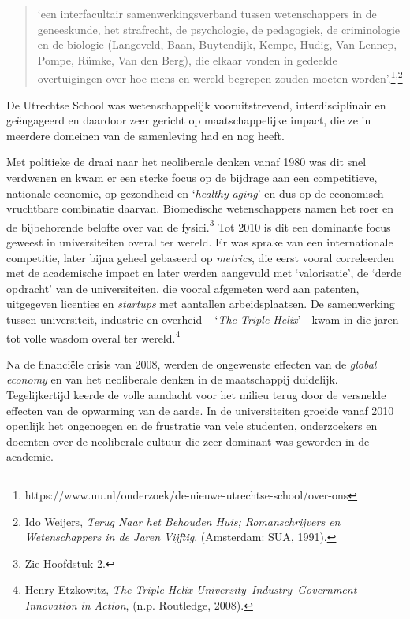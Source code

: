 \documentclass[smallauthor, chapterhaspagenum, nochapterinheader, pagenuminheader,  bigchapnum,medium2, tocpages,  garamond, titleinheader]{jote-book}
\begin{document}
	\begin{quote}
		\itshape

		‘een interfacultair samenwerkingsverband tussen wetenschappers in de geneeskunde, het strafrecht, de psychologie, de pedagogiek, de criminologie en de biologie (Langeveld, Baan, Buytendijk, Kempe, Hudig, Van Lennep, Pompe, Rümke, Van den Berg), die elkaar vonden in gedeelde overtuigingen over hoe mens en wereld begrepen zouden moeten worden'.\footnote{https://www.uu.nl/onderzoek/de-nieuwe-utrechtse-school/over-ons}\textsuperscript{,}\footnote{Ido Weijers, \emph{Terug Naar het Behouden Huis; Romanschrijvers en Wetenschappers in de Jaren Vijftig}. (Amsterdam: SUA, 1991). }
	\end{quote}

	 De Utrechtse School was wetenschappelijk vooruitstrevend, interdisciplinair en geëngageerd en daardoor zeer gericht op maatschappelijke impact, die ze in meerdere domeinen van de samenleving had en nog heeft.



	Met politieke de draai naar het neoliberale denken vanaf 1980 was dit snel verdwenen en kwam er een sterke focus op de bijdrage aan een competitieve, nationale economie, op gezondheid en ‘\emph{healthy}\emph{ }\emph{aging}' en dus op de economisch vruchtbare combinatie daarvan. Biomedische wetenschappers namen het roer en de bijbehorende belofte over van de fysici.\footnote{Zie Hoofdstuk 2.} Tot 2010 is dit een dominante focus geweest in universiteiten overal ter wereld. Er was sprake van een internationale competitie, later bijna geheel gebaseerd op \emph{metrics}, die eerst vooral correleerden met de academische impact en later werden aangevuld met ‘valorisatie', de ‘derde opdracht' van de universiteiten, die vooral afgemeten werd aan patenten, uitgegeven licenties en \emph{startups} met aantallen arbeidsplaatsen. De samenwerking tussen universiteit, industrie en overheid -- ‘\emph{The Triple Helix}' - kwam in die jaren tot volle wasdom overal ter wereld.\footnote{Henry Etzkowitz, \emph{The Triple Helix University--}\emph{Industry}\emph{--}\emph{Government}\emph{ }\emph{Innovation}\emph{ in Action}, (n.p. Routledge, 2008). }



	Na de financiële crisis van 2008, werden de ongewenste effecten van de \emph{global}\emph{ }\emph{economy} en van het neoliberale denken in de maatschappij duidelijk. Tegelijkertijd keerde de volle aandacht voor het milieu terug door de versnelde effecten van de opwarming van de aarde. In de universiteiten groeide vanaf 2010 openlijk het ongenoegen en de frustratie van vele studenten, onderzoekers en docenten over de neoliberale cultuur die zeer dominant was geworden in de academie.
\end{document}
